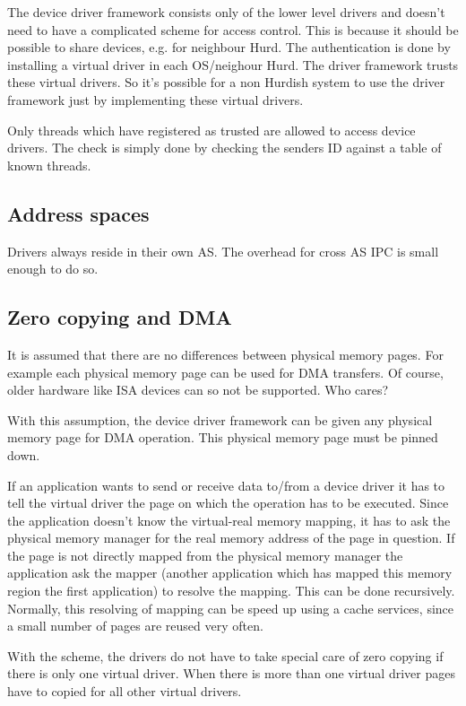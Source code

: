 The device driver framework consists only of the lower level drivers
and doesn't need to have a complicated scheme for access control.
This is because it should be possible to share devices, e.g. for
neighbour Hurd.  The authentication is done by installing a virtual
driver in each OS/neighour Hurd.  The driver framework trusts these
virtual drivers.  So it's possible for a non Hurdish system to use
the driver framework just by implementing these virtual drivers.
  
Only threads which have registered as trusted are allowed to access
device drivers.  The check is simply done by checking the senders
ID against a table of known threads.

\subsection{Address spaces}

Drivers always reside in their own AS. The overhead for cross AS IPC
is small enough to do so.

\subsection{Zero copying and DMA}

It is assumed that there are no differences between physical memory
pages. For example each physical memory page can be used for DMA
transfers. Of course, older hardware like ISA devices can so not be
supported. Who cares?
  
With this assumption, the device driver framework can be given any
physical memory page for DMA operation.  This physical memory page
must be pinned down.
  
If an application wants to send or receive data to/from a device
driver it has to tell the virtual driver the page on which the
operation has to be executed.  Since the application doesn't know
the virtual-real memory mapping, it has to ask the physical memory
manager for the real memory address of the page in question.  If the
page is not directly mapped from the physical memory manager the
application ask the mapper (another application which has mapped
this memory region the first application) to resolve the mapping.
This can be done recursively.  Normally, this resolving of mapping
can be speed up using a cache services, since a small number of
pages are reused very often.
  
With the scheme, the drivers do not have to take special care of
zero copying if there is only one virtual driver.  When there is
more than one virtual driver pages have to copied for all other
virtual drivers.

